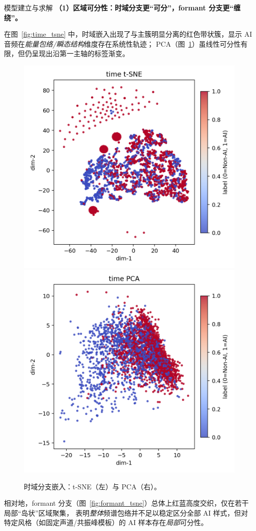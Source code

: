 \documentclass[aspectratio=169]{beamer}
\providecommand{\paragraph}[1]{\smallskip\textbf{#1}\par}
\begin{document}
\begin{frame}{模型建立与求解}
\paragraph{（1）区域可分性：时域分支更“可分”，formant 分支更“缠绕”。}
在图~\ref{fig:time_tsne} 中，时域嵌入出现了与主簇明显分离的红色带状簇，显示 AI 音频在\emph{能量包络/瞬态结构}维度存在系统性轨迹；
PCA（图~\ref{fig:time_pca}）虽线性可分性有限，但仍呈现出沿第一主轴的标签渐变。

\begin{figure}[H]
  \centering
  \includegraphics[width=.4\linewidth]{images_in_paper/embed_time_tsne.png}
  \includegraphics[width=.4\linewidth]{images_in_paper/embed_time_pca.png}
  \caption{时域分支嵌入：t-SNE（左）与 PCA（右）。}
  \label{fig:time_tsne}
  \label{fig:time_pca}
\end{figure}

相对地，formant 分支（图~\ref{fig:formant_tsne}）总体上红蓝高度交织，仅在若干局部“岛状”区域聚集，
表明\emph{整体}频谱包络并不足以稳定区分全部 AI 样式，但对特定风格（如固定声道/共振峰模板）的 AI 样本存在\emph{局部}可分性。


\end{frame}
\end{document}

